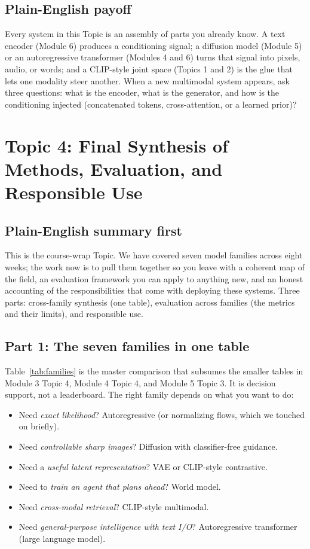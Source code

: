 \documentclass[11pt]{article}
\theoremstyle{remark}
\begin{document}
\subsection*{Plain-English payoff}
Every system in this Topic is an assembly of parts you already know. A text encoder (Module 6) produces a conditioning signal; a diffusion model (Module 5) or an autoregressive transformer (Modules 4 and 6) turns that signal into pixels, audio, or words; and a CLIP-style joint space (Topics 1 and 2) is the glue that lets one modality steer another. When a new multimodal system appears, ask three questions: what is the encoder, what is the generator, and how is the conditioning injected (concatenated tokens, cross-attention, or a learned prior)?

\section{Topic 4: Final Synthesis of Methods, Evaluation, and Responsible Use}

\subsection*{Plain-English summary first}
This is the course-wrap Topic. We have covered seven model families across eight weeks; the work now is to pull them together so you leave with a coherent map of the field, an evaluation framework you can apply to anything new, and an honest accounting of the responsibilities that come with deploying these systems. Three parts: cross-family synthesis (one table), evaluation across families (the metrics and their limits), and responsible use.

\subsection{Part 1: The seven families in one table}
Table~\ref{tab:families} is the master comparison that subsumes the smaller tables in Module 3 Topic 4, Module 4 Topic 4, and Module 5 Topic 3. It is decision support, not a leaderboard. The right family depends on what you want to do:
\begin{itemize}[leftmargin=1.4em]
  \item Need \emph{exact likelihood}? Autoregressive (or normalizing flows, which we touched on briefly).
  \item Need \emph{controllable sharp images}? Diffusion with classifier-free guidance.
  \item Need a \emph{useful latent representation}? VAE or CLIP-style contrastive.
  \item Need to \emph{train an agent that plans ahead}? World model.
  \item Need \emph{cross-modal retrieval}? CLIP-style multimodal.
  \item Need \emph{general-purpose intelligence with text I/O}? Autoregressive transformer (large language model).
\end{itemize}
\end{document}
